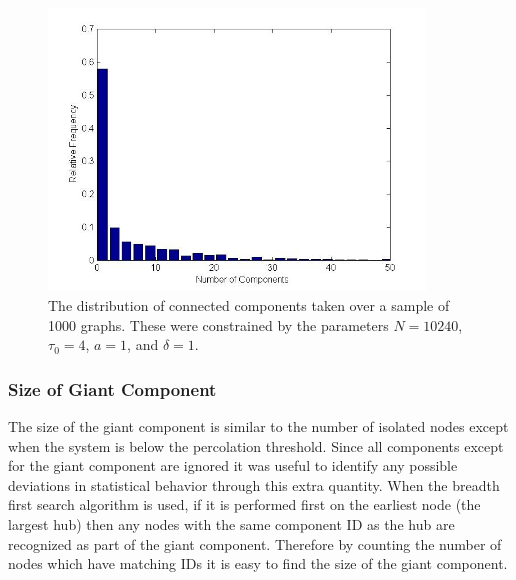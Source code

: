 \documentclass[preprint,notitlepage,amsmath,amssymb,floatfix]{revtex4-1}
\begin{document}
\begin{figure}
\includegraphics[width=10cm]{figures/Number_Components.jpg}
\caption{The distribution of connected components taken over a sample of 1000 graphs.  These were constrained by the parameters $N = 10240$, $\tau_0 = 4$, $a = 1$, and $\delta = 1$.}
\label{fig:num_comp_uni}
\centering
\end{figure}

\subsubsection{Size of Giant Component}
The size of the giant component is similar to the number of isolated nodes except when the system is below the percolation threshold.  
Since all components except for the giant component are ignored it was useful to identify any possible deviations in statistical behavior through this extra quantity.
When the breadth first search algorithm is used, if it is performed first on the earliest node (the largest hub) then any nodes with the same component ID as the hub are recognized as part of the giant component.
Therefore by counting the number of nodes which have matching IDs it is easy to find the size of the giant component.

\end{document}
